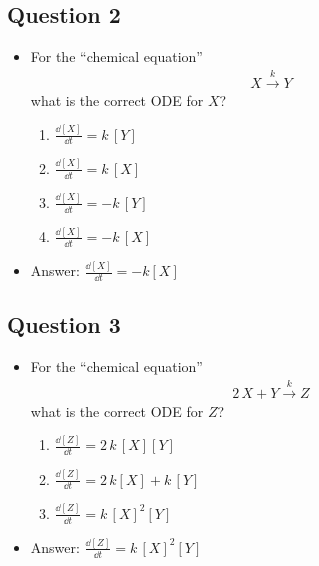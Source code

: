
\begin{slide}
\section{Question 2}

\begin{PauseHighLight}
  \begin{itemize}
  \item For the ``chemical equation''
    \begin{align*}
      X \stackrel{k}{\longrightarrow} Y
    \end{align*}
    what is the correct ODE for $X$?
    \begin{enumerate}\setlength\itemsep{0.5em}
    \item $\frac{\dd [X]}{\dd t} = k\, [Y]$
    \item $\frac{\dd [X]}{\dd t} = k\, [X]$
    \item $\frac{\dd [X]}{\dd t} = -k\, [Y]$
    \item $\frac{\dd [X]}{\dd t} = -k\, [X]$\pause
    \end{enumerate}
    \item Answer: $\frac{\dd [X]}{\dd t} = -k [X]$\pauseb
  \end{itemize}
\end{PauseHighLight}

\end{slide}


\begin{slide}
\section{Question 3}

\begin{PauseHighLight}
  \begin{itemize}
  \item For the ``chemical equation''
    \begin{align*}
      2\,X + Y \stackrel{k}{\longrightarrow} Z
    \end{align*}
    what is the correct ODE for $Z$?
    \begin{enumerate}\setlength\itemsep{0.5em}
    \item $\frac{\dd [Z]}{\dd t} = 2\,k\,[X] [Y]$
    \item $\frac{\dd [Z]}{\dd t} = 2\,k [X] + k\, [Y]$
    \item $\frac{\dd [Z]}{\dd t} = k\,[X]^2 [Y]$\pause
    \end{enumerate}
    \item Answer: $\frac{\dd [Z]}{\dd t} = k\,[X]^2 [Y]$\pauseb
  \end{itemize}
\end{PauseHighLight}

\end{slide}

